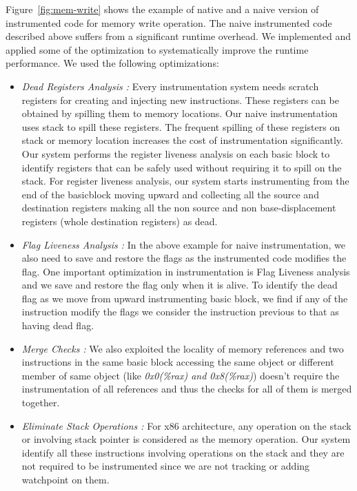 Figure~\ref{fig:mem-write} shows the example of native and a naive version of instrumented code for memory write operation. The naive instrumented code described above suffers from a significant runtime overhead. We implemented and applied some of the optimization to systematically improve the runtime performance. We used the following optimizations: 
\begin{itemize}
	\item \emph{Dead Registers Analysis : }Every instrumentation system needs scratch registers for creating and injecting new instructions. These registers can be obtained by spilling them to memory locations. Our naive instrumentation uses stack to spill these registers. The frequent spilling of these registers on stack or memory location increases the cost of instrumentation significantly. Our system performs the register liveness analysis on each basic block to identify registers that can be safely used without requiring it to spill on the stack. For register liveness analysis, our system starts instrumenting from the end of the basicblock moving upward and collecting all the source and destination registers making all the non source and non base-displacement registers (whole destination registers) as dead.  
	\item \emph{Flag Liveness Analysis : } In the above example for naive instrumentation, we also need to save and restore the flags as the instrumented code modifies the flag. One important optimization in instrumentation is Flag Liveness analysis and we save and restore the flag only when it is alive. To identify the dead flag as we move from upward instrumenting basic block, we find if any of the instruction modify the flags we consider the instruction previous to that as having dead flag. 
	\item \emph{Merge Checks :} We also exploited the locality of memory references and two instructions in the same basic block accessing the same object or different member of same object (like \emph{0x0(\%rax) and 0x8(\%rax)}) doesn’t require the instrumentation of all references and thus the checks for all of them is merged together.
    \item \emph{Eliminate Stack Operations :} For x86 architecture, any operation on the stack or involving stack pointer is considered as the memory operation. Our system identify all these instructions involving operations on the stack and they are not required to be instrumented since we are not tracking or adding watchpoint on them.
\end{itemize}

